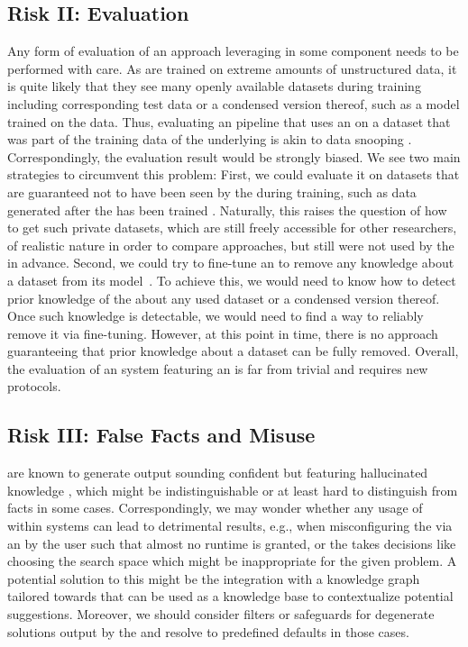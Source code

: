 \subsection{Risk II: Evaluation}
Any form of evaluation of an \AutoML approach leveraging \LLMs in some component needs to be performed with care. As \LLMs are trained on extreme amounts of unstructured data, it is quite likely that they see many openly available \ML datasets during training including corresponding test data or a condensed version thereof, such as a model trained on the data. Thus, evaluating an \AutoML pipeline that uses an \LLM on a dataset that was part of the training data of the underlying \LLM is akin to data snooping \cite{kok-us1984}. Correspondingly, the evaluation result would be strongly biased. We see two main strategies to circumvent this problem: First, we could evaluate it on datasets that are guaranteed not to have been seen by the \LLM during training, such as data generated after the \LLM has been trained \cite{faggioli2023perspectives}. Naturally, this raises the question of how to get such private datasets, which are still freely accessible for other researchers, of realistic nature in order to compare approaches, but still were not used by the \LLM in advance. Second, we could try to fine-tune an \LLM to remove any knowledge about a dataset from its model~\cite{yang-arxiv22a}. To achieve this, we would need to know how to detect prior knowledge of the \LLMs about any used dataset or a condensed version thereof. Once such knowledge is detectable, we would need to find a way to reliably remove it via fine-tuning. However, at this point in time, there is no approach guaranteeing that prior knowledge about a dataset can be fully removed. Overall, the evaluation of an \AutoML system featuring an \LLM is far from trivial and requires new protocols.  

\subsection{Risk III: False Facts and Misuse}
\LLMs are known to generate output sounding confident but featuring hallucinated knowledge \cite{ji-acmcs23a}, which might be indistinguishable or at least hard to distinguish from facts in some cases. Correspondingly, we may wonder whether any usage of \LLMs within \AutoML systems can lead to detrimental results, e.g., when misconfiguring the \AutoML via an \LLM by the user such that almost no runtime is granted, or the \LLM takes decisions like choosing the search space which might be inappropriate for the given problem. 
A potential solution to this might be the integration with a knowledge graph \cite{hogan-acmcs22a} tailored towards \AutoML that can be used as a knowledge base to contextualize potential \LLM suggestions. Moreover, we should consider filters or safeguards for degenerate solutions output by the \LLM and resolve to predefined defaults in those cases.

